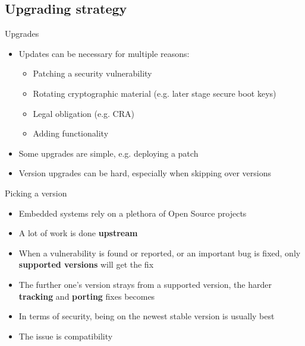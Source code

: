 \subsection{Upgrading strategy}

\begin{frame}{Upgrades}
  \begin{itemize}
    \item Updates can be necessary for multiple reasons:
    \begin{itemize}
      \item Patching a security vulnerability
      \item Rotating cryptographic material (e.g. later stage secure boot keys)
      \item Legal obligation (e.g. CRA)
      \item Adding functionality
    \end{itemize}
    \item Some upgrades are simple, e.g. deploying a patch
    \item Version upgrades can be hard, especially when skipping over versions
  \end{itemize}
\end{frame}

\begin{frame}{Picking a version}
  \begin{itemize}
    \item Embedded systems rely on a plethora of Open Source projects
    \item A lot of work is done \textbf{upstream}
    \item When a vulnerability is found or reported, or an important bug is fixed,
	  only \textbf{supported versions} will get the fix
    \item The further one's version strays from a supported version, the harder
          \textbf{tracking} and \textbf{porting} fixes becomes
    \item In terms of security, being on the newest stable version is usually best
    \item The issue is compatibility
  \end{itemize}
\end{frame}

